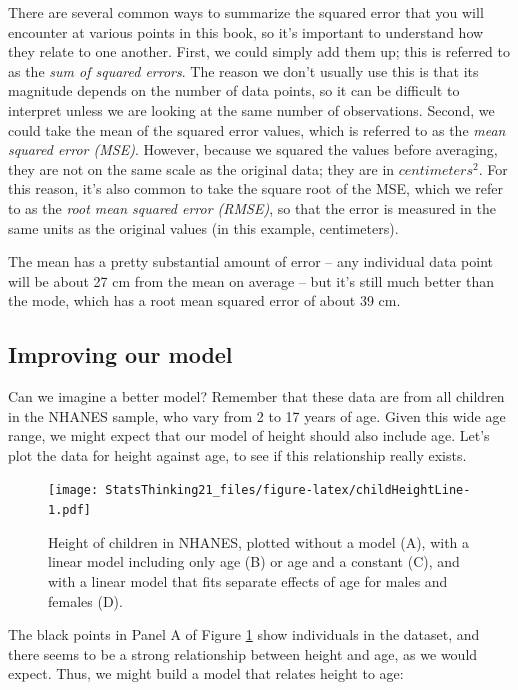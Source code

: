 \documentclass[12pt,]{book}
\theoremstyle{definition}
\theoremstyle{definition}
\theoremstyle{definition}
\theoremstyle{remark}
\begin{document}
There are several common ways to summarize the squared error that you will encounter at various points in this book, so it's important to understand how they relate to one another. First, we could simply add them up; this is referred to as the \emph{sum of squared errors}. The reason we don't usually use this is that its magnitude depends on the number of data points, so it can be difficult to interpret unless we are looking at the same number of observations. Second, we could take the mean of the squared error values, which is referred to as the \emph{mean squared error (MSE)}. However, because we squared the values before averaging, they are not on the same scale as the original data; they are in \(centimeters^2\). For this reason, it's also common to take the square root of the MSE, which we refer to as the \emph{root mean squared error (RMSE)}, so that the error is measured in the same units as the original values (in this example, centimeters).

The mean has a pretty substantial amount of error -- any individual data point will be about 27 cm from the mean on average -- but it's still much better than the mode, which has a root mean squared error of about 39 cm.

\hypertarget{improving-our-model}{%
\subsection{Improving our model}\label{improving-our-model}}

Can we imagine a better model? Remember that these data are from all children in the NHANES sample, who vary from 2 to 17 years of age. Given this wide age range, we might expect that our model of height should also include age. Let's plot the data for height against age, to see if this relationship really exists.

\begin{figure}
\centering
\texttt{[image: StatsThinking21\_files/figure-latex/childHeightLine-1.pdf]}
\caption{\label{fig:childHeightLine}Height of children in NHANES, plotted without a model (A), with a linear model including only age (B) or age and a constant (C), and with a linear model that fits separate effects of age for males and females (D).}
\end{figure}

The black points in Panel A of Figure \ref{fig:childHeightLine} show individuals in the dataset, and there seems to be a strong relationship between height and age, as we would expect. Thus, we might build a model that relates height to age:
\end{document}

